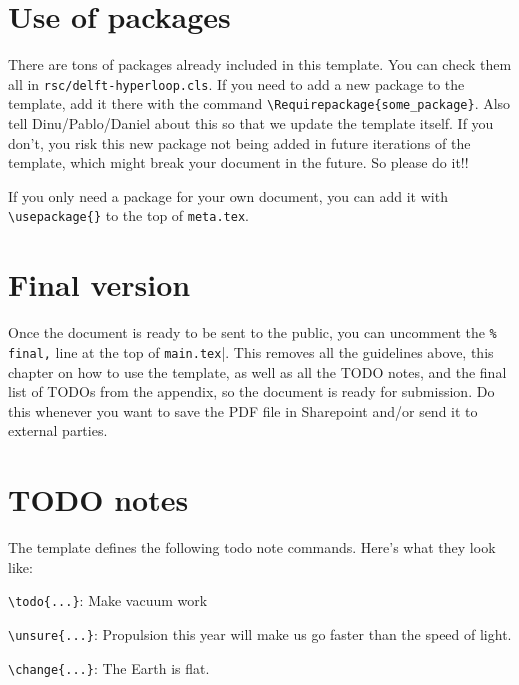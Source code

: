 \section*{Use of packages}

There are tons of packages already included in this template. You can check them all in \verb|rsc/delft-hyperloop.cls|. If you need to add a new package to the template, add it there with the command \verb|\Requirepackage{some_package}|. Also tell Dinu/Pablo/Daniel about this so that we update the template itself. If you don't, you risk this new package not being added in future iterations of the template, which might break your document in the future. So please do it!!

If you only need a package for your own document, you can add it with \verb|\usepackage{}| to the top of \verb|meta.tex|.

\section*{Final version}

Once the document is ready to be sent to the public, you can uncomment the \verb|% final,| line at the top of \verb|main.tex||. This removes all the guidelines above, this chapter on how to use the template, as well as all the TODO notes, and the final list of TODOs from the appendix, so the document is ready for submission. Do this whenever you want to save the PDF file in Sharepoint and/or send it to external parties.


\section*{TODO notes}

The template defines the following todo note commands. Here's what they look like:

\vspace{5em}

\verb|\todo{...}|: Make vacuum work 

\vspace{5em}

\verb|\unsure{...}|: Propulsion this year will make us go faster than the speed of light. 

\vspace{5em}

\verb|\change{...}|: The Earth is flat. 

